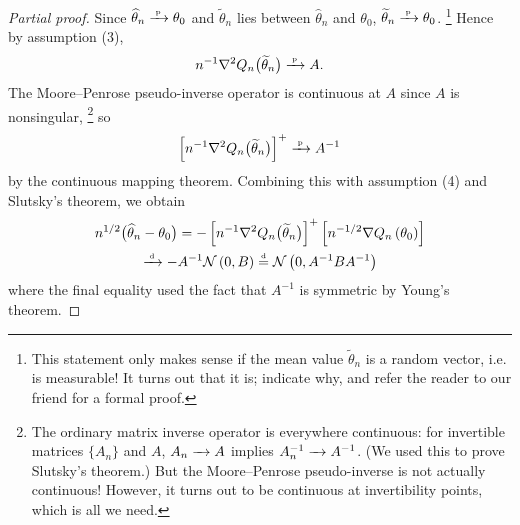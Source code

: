 \documentclass[11pt,letterpaper,reqno,oneside]{article}
\begin{document}
\begin{proof}[Partial proof]
	Since $\widehat{\theta}_n \xrightarrow{{\scriptscriptstyle \mathrm{\;p\;}}} \theta_0$ and $\widetilde{\theta}_n$ lies between $\widehat{\theta}_n$ and $\theta_0$, $\widetilde{\theta}_n \xrightarrow{{\scriptscriptstyle \mathrm{\;p\;}}} \theta_0$.%
		\footnote{\label{footnote:measurable_mean_value}This statement only makes sense if the mean value $\widetilde{\theta}_n$ is a random vector, i.e. is measurable! It turns out that it is; \textcite[][p. 2141, footnote 25]{NeweyMcfadden1994} indicate why, and refer the reader to our friend \textcite{Jennrich1969} for a formal proof.}
	Hence by assumption (3),
	\begin{equation*}
		n^{-1} \nabla^2 Q_n\bigl( \widetilde{\theta}_n \bigr) \xrightarrow{{\scriptscriptstyle \mathrm{\;p\;}}} A .
	\end{equation*}
	The Moore--Penrose pseudo-inverse operator is continuous at $A$ since $A$ is nonsingular,%
		\footnote{The ordinary matrix inverse operator is everywhere continuous: for invertible matrices $\{ A_n \}$ and $A$, $A_n \xrightarrow{\;\;\;} A$ implies $A_n^{-1} \xrightarrow{\;\;\;} A^{-1}$. (We used this to prove Slutsky's theorem.) But the Moore--Penrose pseudo-inverse is not actually continuous! However, it turns out to be continuous at invertibility points, which is all we need.}
	so
	\begin{equation*}
		\left[ n^{-1} \nabla^2 Q_n\bigl( \widetilde{\theta}_n \bigr) \right]^+ \xrightarrow{{\scriptscriptstyle \mathrm{\;p\;}}} A^{-1}
	\end{equation*}
	by the continuous mapping theorem. Combining this with assumption (4) and Slutsky's theorem, we obtain
	\begin{multline*}
		n^{1/2} \bigl( \widehat{\theta}_n - \theta_0 \bigr)
		= - \left[ n^{-1} \nabla^2 Q_n\bigl( \widetilde{\theta}_n \bigr) \right]^+
		\left[ n^{-1/2} \nabla Q_n\left( \theta_0 \right) \right] 
		\\
		\xrightarrow{{\scriptscriptstyle \mathrm{\;d\;}}}
		- A^{-1} \mathcal{N}\left(0,B\right)
		\protect\overset{{\scriptscriptstyle \mathrm{d}}}{=} \mathcal{N}\left( 0, A^{-1} B A^{-1} \right)
	\end{multline*}
	where the final equality used the fact that $A^{-1}$ is symmetric by Young's theorem.
\end{proof}
\end{document}
